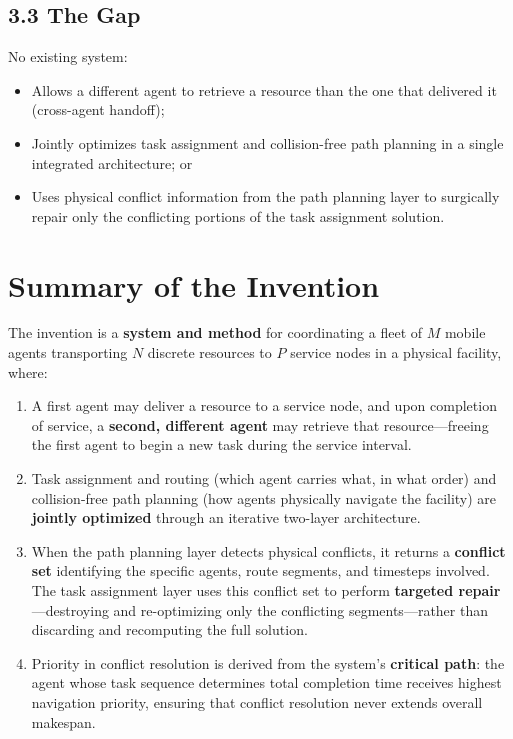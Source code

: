 \documentclass[12pt]{article}
\begin{document}
\subsection{3.3 \quad The Gap}

No existing system:
\begin{itemize}[leftmargin=2em]
    \item Allows a different agent to retrieve a resource than the one that delivered it (cross-agent handoff);
    \item Jointly optimizes task assignment and collision-free path planning in a single integrated architecture; or
    \item Uses physical conflict information from the path planning layer to surgically repair only the conflicting portions of the task assignment solution.
\end{itemize}

\section{Summary of the Invention}

The invention is a \textbf{system and method} for coordinating a fleet of $M$ mobile agents transporting $N$ discrete resources to $P$ service nodes in a physical facility, where:

\begin{enumerate}[leftmargin=2em]
    \item A first agent may deliver a resource to a service node, and upon completion of service, a \textbf{second, different agent} may retrieve that resource---freeing the first agent to begin a new task during the service interval.

    \item Task assignment and routing (which agent carries what, in what order) and collision-free path planning (how agents physically navigate the facility) are \textbf{jointly optimized} through an iterative two-layer architecture.

    \item When the path planning layer detects physical conflicts, it returns a \textbf{conflict set} identifying the specific agents, route segments, and timesteps involved. The task assignment layer uses this conflict set to perform \textbf{targeted repair}---destroying and re-optimizing only the conflicting segments---rather than discarding and recomputing the full solution.

    \item Priority in conflict resolution is derived from the system's \textbf{critical path}: the agent whose task sequence determines total completion time receives highest navigation priority, ensuring that conflict resolution never extends overall makespan.
\end{enumerate}
\end{document}
